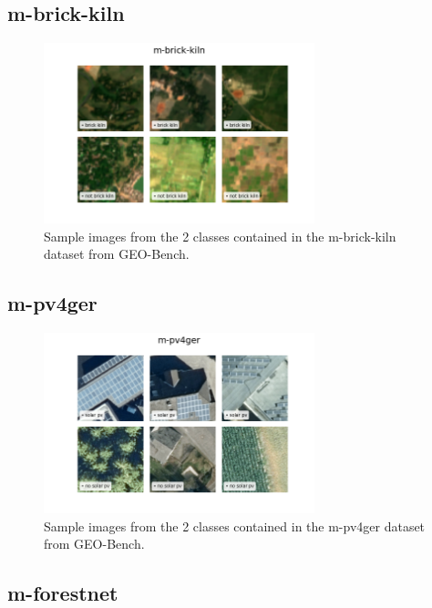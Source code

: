 \documentclass[a4paper, oneside, english]{sapthesis}
\begin{document}
\subsection{m-brick-kiln}


\begin{figure}[h]
    \centering
    \includegraphics[width=0.7\textwidth]{img/m-brick-kiln_image_grid.png}
    \caption{Sample images from the 2 classes contained in the m-brick-kiln dataset from GEO-Bench.}
    \label{fig:brickgrid}
\end{figure}


\subsection{m-pv4ger}

\begin{figure}[h]
    \centering
    \includegraphics[width=0.7\textwidth]{img/m-pv4ger_image_grid.png}
    \caption{Sample images from the 2 classes contained in the m-pv4ger dataset from GEO-Bench.}
    \label{fig:solargrid}
\end{figure}


\subsection{m-forestnet}
\end{document}
